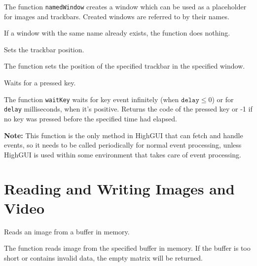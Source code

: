 The function \texttt{namedWindow} creates a window which can be used as a placeholder for images and trackbars. Created windows are referred to by their names.

If a window with the same name already exists, the function does nothing.

Sets the trackbar position.

\begin{description}
\end{description}

The function sets the position of the specified trackbar in the specified window.


Waits for a pressed key.

\begin{description}
\end{description}

The function \texttt{waitKey} waits for key event infinitely (when $\texttt{delay}\leq 0$) or for \texttt{delay} milliseconds, when it's positive. Returns the code of the pressed key or -1 if no key was pressed before the specified time had elapsed.

\textbf{Note:} This function is the only method in HighGUI that can fetch and handle events, so it needs to be called periodically for normal event processing, unless HighGUI is used within some environment that takes care of event processing.

\section{Reading and Writing Images and Video}

Reads an image from a buffer in memory.
\begin{description}
\end{description}

The function reads image from the specified buffer in memory.
If the buffer is too short or contains invalid data, the empty matrix will be returned.


